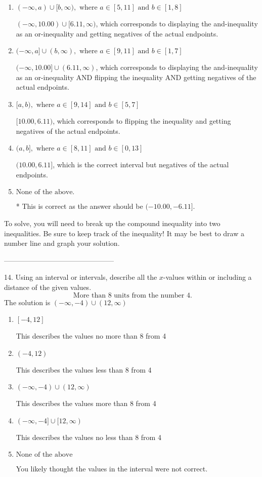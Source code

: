 \documentclass{extbook}[14pt]
\begin{document}
\begin{enumerate}[label=\Alph*.] 
\item $ (-\infty, a) \cup [b, \infty), \text{ where } a \in [5, 11] \text{ and } b \in [1, 8] $ 

 $(-\infty, 10.00) \cup [6.11, \infty)$, which corresponds to displaying the and-inequality as an or-inequality and getting negatives of the actual endpoints. 
\item $ (-\infty, a] \cup (b, \infty), \text{ where } a \in [9, 11] \text{ and } b \in [1, 7] $ 

 $(-\infty, 10.00] \cup (6.11, \infty)$, which corresponds to displaying the and-inequality as an or-inequality AND flipping the inequality AND getting negatives of the actual endpoints. 
\item $ [a, b), \text{ where } a \in [9, 14] \text{ and } b \in [5, 7] $ 

 $[10.00, 6.11)$, which corresponds to flipping the inequality and getting negatives of the actual endpoints. 
\item $ (a, b], \text{ where } a \in [8, 11] \text{ and } b \in [0, 13] $ 

 $(10.00, 6.11]$, which is the correct interval but negatives of the actual endpoints. 
\item $ \text{None of the above.} $ 

 * This is correct as the answer should be $(-10.00, -6.11]$. 
\end{enumerate} 
 
To solve, you will need to break up the compound inequality into two inequalities. Be sure to keep track of the inequality! It may be best to draw a number line and graph your solution.

-----------------------------------------------

14. Using an interval or intervals, describe all the $x$-values within or including a distance of the given values.
\[ \text{ More than } 8 \text{ units from the number } 4. \] 
The solution is $ (-\infty, -4) \cup (12, \infty) $ 

\begin{enumerate}[label=\Alph*.] 
\item $ [-4, 12] $ 

 This describes the values no more than 8 from 4 
\item $ (-4, 12) $ 

 This describes the values less than 8 from 4 
\item $ (-\infty, -4) \cup (12, \infty) $ 

 This describes the values more than 8 from 4 
\item $ (-\infty, -4] \cup [12, \infty) $ 

 This describes the values no less than 8 from 4 
\item $ \text{None of the above} $ 

 You likely thought the values in the interval were not correct. 
\end{enumerate} 
 
\end{document}
